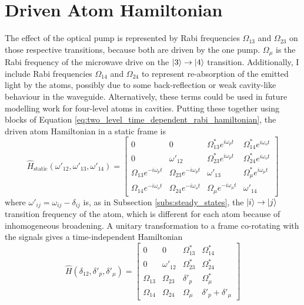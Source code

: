 \section{Driven Atom Hamiltonian}
The effect of the optical pump is represented by Rabi frequencies $\Omega_{13}$ and $\Omega_{23}$ on those respective transitions, because both are driven by the one pump. $\Omega_\mu$ is the Rabi frequency of the microwave drive on the $\left|3\right\rangle\to\left|4\right\rangle$ transition. Additionally, I include Rabi frequencies $\Omega_{14}$ and $\Omega_{24}$ to represent re-absorption of the emitted light by the atoms, possibly due to some back-reflection or weak cavity-like behaviour in the waveguide. Alternatively, these terms could be used in future modelling work for four-level atoms in cavities. Putting these together using blocks of Equation \ref{eq:two_level_time_dependent_rabi_hamiltonian}, the driven atom Hamiltonian in a static frame is
\begin{equation}
    \hat{H}_\text{static}(\omega'_{12}, \omega'_{13}, \omega'_{14}) =
    \begin{bmatrix}
        0 & 0 & \Omega_{13}^* e^{i\omega_p t} & \Omega_{14}^* e^{i\omega_o t}\\
        0 & \omega'_{12} & \Omega_{23}^* e^{i\omega_p t} & \Omega_{24}^* e^{i\omega_o t}\\
        \Omega_{13} e^{-i\omega_p t} & \Omega_{23} e^{-i\omega_p t} & \omega'_{13} & \Omega_\mu^* e^{i\omega_\mu t}\\
        \Omega_{14} e^{-i\omega_o t} & \Omega_{24} e^{-i\omega_o t} & \Omega_\mu e^{-i\omega_\mu t} & \omega'_{14}
    \end{bmatrix}
\end{equation}
where $\omega'_{ij} = \omega_{ij} - \delta_{ij}$ is, as in Subsection \ref{subs:steady_states}, the $\left|i\right\rangle\to\left|j\right\rangle$ transition frequency of the atom, which is different for each atom because of inhomogeneous broadening. A unitary transformation to a frame co-rotating with the signals gives a time-independent Hamiltonian
\begin{equation}
    \hat{H}(\delta_{12}, \delta'_p, \delta'_\mu) =
    \begin{bmatrix}
        0 & 0 & \Omega_{13}^* & \Omega_{14}^*\\
        0 & \omega'_{12} & \Omega_{23}^* & \Omega_{24}^*\\
        \Omega_{13} & \Omega_{23} & \delta'_p & \Omega_\mu^*\\
        \Omega_{14} & \Omega_{24} & \Omega_\mu & \delta'_p + \delta'_\mu
    \end{bmatrix}
\end{equation}
